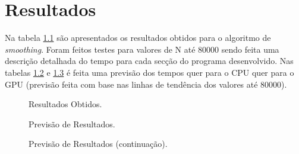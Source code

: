 \chapter{Resultados}
\label{chap:res}
Na tabela \ref{tabela} são apresentados os resultados obtidos para o algoritmo de \textit{smoothing}. Foram feitos testes para valores de N até 80000 sendo feita uma descrição detalhada do tempo para cada secção do programa desenvolvido. Nas tabelas \ref{tabela1} e \ref{tabela2} é feita uma previsão dos tempos quer para o CPU quer para o GPU (previsão feita com base nas linhas de tendência dos valores até 80000).

\begin{figure}[H]
	\begin{center}
		\caption{Resultados Obtidos.}
		\label{tabela}
	\end{center}
\end{figure}

\begin{figure}[H]
	\begin{center}
		\caption{Previsão de Resultados.}
		\label{tabela1}
	\end{center}
\end{figure}

\begin{figure}[H]
	\begin{center}
		\caption{Previsão de Resultados (continuação).}
		\label{tabela2}
	\end{center}
\end{figure}

